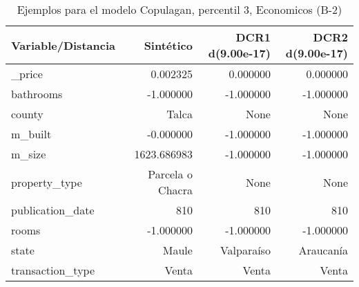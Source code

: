 \begin{table}[H]
\centering
\fontsize{10}{14}\selectfont
\caption{Ejemplos para el modelo Copulagan, percentil 3, Economicos (B-2)}
\label{table-example-economicos-b-2-copulagan-3p}
\begin{tabular}{|l|r|r|r|}
\hline
\rowcolor[gray]{0.8}
Variable/Distancia & Sintético & DCR1 d(9.00e-17) & DCR2 d(9.00e-17) \\
\hline \_price & \cellcolor[rgb]{0.9, 0.54, 0.52} 0.002325 & \cellcolor[rgb]{0.9, 0.54, 0.52} 0.000000 & \cellcolor[rgb]{0.9, 0.54, 0.52} 0.000000 \\
\hline bathrooms & \cellcolor[rgb]{0.9, 0.54, 0.52} -1.000000 & \cellcolor[rgb]{0.9, 0.54, 0.52} -1.000000 & \cellcolor[rgb]{0.9, 0.54, 0.52} -1.000000 \\
\hline county & \cellcolor[rgb]{0.9, 0.54, 0.52} Talca & None & None \\
\hline m\_built & \cellcolor[rgb]{0.9, 0.54, 0.52} -0.000000 & \cellcolor[rgb]{0.9, 0.54, 0.52} -1.000000 & \cellcolor[rgb]{0.9, 0.54, 0.52} -1.000000 \\
\hline m\_size & \cellcolor[rgb]{0.9, 0.54, 0.52} 1623.686983 & -1.000000 & -1.000000 \\
\hline property\_type & \cellcolor[rgb]{0.9, 0.54, 0.52} Parcela o Chacra & None & None \\
\hline publication\_date & \cellcolor[rgb]{0.9, 0.54, 0.52} 810 & \cellcolor[rgb]{0.9, 0.54, 0.52} 810 & \cellcolor[rgb]{0.9, 0.54, 0.52} 810 \\
\hline rooms & \cellcolor[rgb]{0.9, 0.54, 0.52} -1.000000 & \cellcolor[rgb]{0.9, 0.54, 0.52} -1.000000 & \cellcolor[rgb]{0.9, 0.54, 0.52} -1.000000 \\
\hline state & \cellcolor[rgb]{0.9, 0.54, 0.52} Maule & Valparaíso & Araucanía \\
\hline transaction\_type & \cellcolor[rgb]{0.9, 0.54, 0.52} Venta & \cellcolor[rgb]{0.9, 0.54, 0.52} Venta & \cellcolor[rgb]{0.9, 0.54, 0.52} Venta \\
\hline
\end{tabular}
\end{table}
